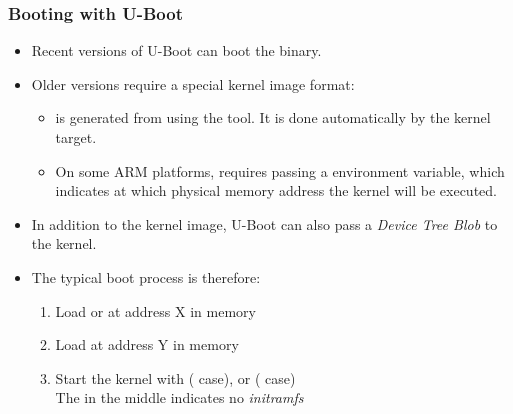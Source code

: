 \begin{frame}
  \frametitle{Booting with U-Boot}
  \begin{itemize}
  \item Recent versions of U-Boot can boot the  binary.
  \item Older versions require a special kernel image format:
    \begin{itemize}
    \item {} is generated from  using the
       tool. It is done automatically by the kernel
       target.
    \item On some ARM platforms,  requires passing a
       environment variable, which indicates at which
      physical memory address the kernel will be executed.
    \end{itemize}
  \item In addition to the kernel image, U-Boot can also pass a
    {\em Device Tree Blob} to the kernel.
  \item The typical boot process is therefore:
    \begin{enumerate}
    \item Load  or  at address X in memory
    \item Load  at address Y in memory
    \item Start the kernel with  ( case),
      or  ( case)\\
      The \code{-} in the middle indicates no {\em initramfs}
    \end{enumerate}
  \end{itemize}
\end{frame}

